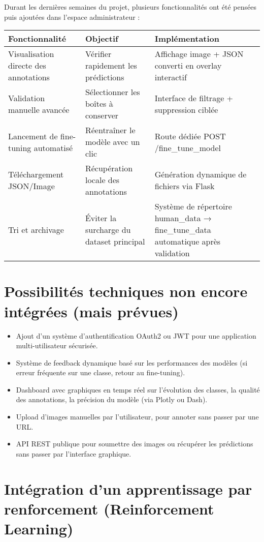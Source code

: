 \documentclass[12pt,a4paper]{report}
\begin{document}
Durant les dernières semaines du projet, plusieurs fonctionnalités ont été pensées puis ajoutées dans l'espace administrateur :

\begin{longtable}{|p{4cm}|p{5cm}|p{5cm}|}
\hline
\textbf{Fonctionnalité} & \textbf{Objectif} & \textbf{Implémentation} \\
\hline
Visualisation directe des annotations & Vérifier rapidement les prédictions & Affichage image + JSON converti en overlay interactif \\
\hline
Validation manuelle avancée & Sélectionner les boîtes à conserver & Interface de filtrage + suppression ciblée \\
\hline
Lancement de fine-tuning automatisé & Réentraîner le modèle avec un clic & Route dédiée POST /fine\_tune\_model \\
\hline
Téléchargement JSON/Image & Récupération locale des annotations & Génération dynamique de fichiers via Flask \\
\hline
Tri et archivage & Éviter la surcharge du dataset principal & Système de répertoire human\_data → fine\_tune\_data automatique après validation \\
\hline
\end{longtable}

\section{Possibilités techniques non encore intégrées (mais prévues)}

\begin{itemize}
\item Ajout d'un système d'authentification OAuth2 ou JWT pour une application multi-utilisateur sécurisée.
\item Système de feedback dynamique basé sur les performances des modèles (si erreur fréquente sur une classe, retour au fine-tuning).
\item Dashboard avec graphiques en temps réel sur l'évolution des classes, la qualité des annotations, la précision du modèle (via Plotly ou Dash).
\item Upload d'images manuelles par l'utilisateur, pour annoter sans passer par une URL.
\item API REST publique pour soumettre des images ou récupérer les prédictions sans passer par l'interface graphique.
\end{itemize}

\section{Intégration d'un apprentissage par renforcement (Reinforcement Learning)}
\end{document}
